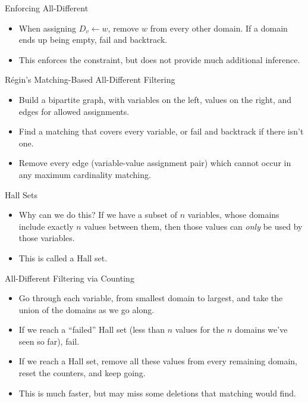 \documentclass{beamer}
\begin{document}
\begin{frame}{Enforcing All-Different}
    \begin{itemize}
        \item When assigning $D_v \gets w$, remove $w$ from every other domain. If a domain ends up
            being empty, fail and backtrack.

        \item This enforces the constraint, but does not provide much additional inference.
    \end{itemize}
\end{frame}

\begin{frame}{R\'egin's Matching-Based All-Different Filtering}
    \begin{itemize}
        \item Build a bipartite graph, with variables on the left, values on
            the right, and edges for allowed assignments.

        \item Find a matching that covers every variable, or fail and backtrack if there isn't
            one.

        \item Remove every edge (variable-value assignment pair) which cannot occur in any
            maximum cardinality matching.
    \end{itemize}
\end{frame}

\begin{frame}{Hall Sets}
    \begin{itemize}
        \item Why can we do this? If we have a subset of $n$ variables, whose domains include
            exactly $n$ values between them, then those values can \emph{only} be used by those
            variables.

        \item This is called a Hall set.
    \end{itemize}
\end{frame}

\begin{frame}{All-Different Filtering via Counting}
    \begin{itemize}
        \item Go through each variable, from smallest domain to largest, and take the union of
            the domains as we go along.

        \item If we reach a ``failed'' Hall set (less than $n$ values for the $n$ domains we've
            seen so far), fail.

        \item If we reach a Hall set, remove all these values from every remaining domain, reset
            the counters, and keep going.

        \item This is much faster, but may miss some deletions that matching would find.
    \end{itemize}
\end{frame}
\end{document}

